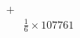 \documentclass[preview]{standalone}
\begin{document}
\begin{align*}
+&\\&\frac{1}{6}\times107761
\end{align*}
\end{document}
